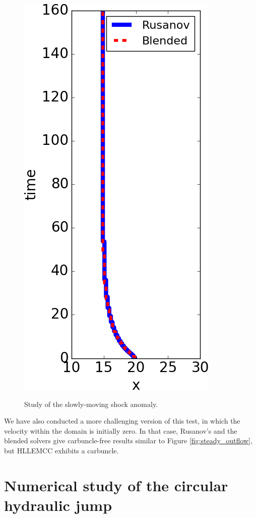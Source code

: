 \documentclass[preprint, 11pt]{article}
\begin{document}
{\begin{figure}[!h]
{      \includegraphics[scale=0.475,valign=c]{figures/pos_shock.png}}
    \caption{Study of the slowly-moving shock anomaly. \label{fig:slowly_moving_anomaly}}
\end{figure}
}



We have also conducted a more challenging version of this test, in which
the velocity within the domain is initially zero.  In that case, Rusanov's 
and the blended solvers give carbuncle-free results similar to Figure \ref{fig:steady_outflow},
but HLLEMCC exhibits a carbuncle.

\section{Numerical study of the circular hydraulic jump}\label{sec:chj}
\end{document}
